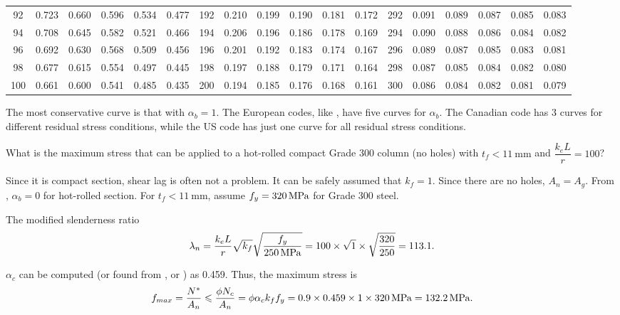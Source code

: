 \begin{table}[H]
\begin{tabular}{c|ccccc|c|ccccc|c|ccccc}
	    92      & 0.723 & 0.660 & 0.596 & 0.534 & 0.477 &     192     & 0.210 & 0.199 & 0.190 & 0.181 & 0.172 &     292     & 0.091 & 0.089 & 0.087 & 0.085 & 0.083 \\
	    94      & 0.708 & 0.645 & 0.582 & 0.521 & 0.466 &     194     & 0.206 & 0.196 & 0.186 & 0.178 & 0.169 &     294     & 0.090 & 0.088 & 0.086 & 0.084 & 0.082 \\
	    96      & 0.692 & 0.630 & 0.568 & 0.509 & 0.456 &     196     & 0.201 & 0.192 & 0.183 & 0.174 & 0.167 &     296     & 0.089 & 0.087 & 0.085 & 0.083 & 0.081 \\
	    98      & 0.677 & 0.615 & 0.554 & 0.497 & 0.445 &     198     & 0.197 & 0.188 & 0.179 & 0.171 & 0.164 &     298     & 0.087 & 0.085 & 0.084 & 0.082 & 0.080 \\
	    100     & 0.661 & 0.600 & 0.541 & 0.485 & 0.435 &     200     & 0.194 & 0.185 & 0.176 & 0.168 & 0.161 &     300     & 0.086 & 0.084 & 0.082 & 0.081 & 0.079 \\ \bottomrule
\end{tabular}
\end{table}

The most conservative curve is that with $\alpha_b=1$. The European codes, like \NZSSTEEL{}, have five curves for $\alpha_b$. The Canadian code has 3 curves for different residual stress conditions, while the US code has just one curve for all residual stress conditions.
\begin{exmp}
What is the maximum stress that can be applied to a hot-rolled compact Grade 300 column (no holes) with $t_f<\SI{11}{\mm}$ and $\dfrac{k_eL}{r}=100$?
\end{exmp}
\begin{solution}
Since it is compact section, shear lag is often not a problem. It can be safely assumed that $k_f=1$. Since there are no holes, $A_n=A_g$. From , $\alpha_b=0$ for hot-rolled section. For $t_f<\SI{11}{\mm}$, assume $f_y=\SI{320}{\mega\pascal}$ for Grade 300 steel.

The modified slenderness ratio
\begin{gather*}
\lambda_n=\dfrac{k_eL}{r}\sqrt{k_f}\sqrt{\dfrac{f_y}{\SI{250}{\mega\pascal}}}=100\times\sqrt{1}\times\sqrt{\dfrac{320}{250}}=113.1.
\end{gather*}

$\alpha_c$ can be computed (or found from , or ) as \num{0.459}. Thus, the maximum stress is
\begin{gather*}
f_{max}=\dfrac{N^*}{A_n}\leqslant\dfrac{\phi{}N_c}{A_n}=\phi\alpha_ck_ff_y=0.9\times0.459\times1\times\SI{320}{\mega\pascal}=\SI{132.2}{\mega\pascal}.
\end{gather*}
\end{solution}

